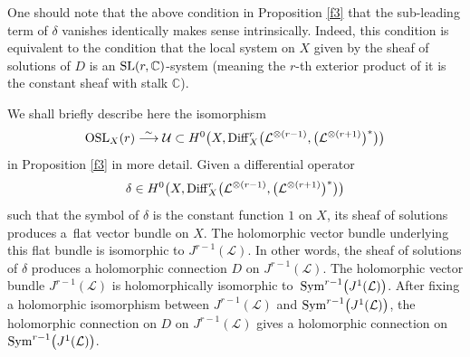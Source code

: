 \documentclass[10pt,a4paper]{amsart}
\numberwithin{equation}{section}
\begin{document}
\begin{Remark}One should note that the above condition in Proposition \ref{f3} that the sub-leading term of $\delta$ vanishes
identically makes sense intrinsically. Indeed, this condition is equivalent to the condition
that the local system on $X$ given by the sheaf of solutions of $D$ is an ${\rm SL}(r,
{\mathbb C})$-system (meaning the $r$-th exterior product of it is the constant sheaf with
stalk $\mathbb C$).\end{Remark}

We shall briefly describe here the isomorphism
\[{\rm OSL}_X(r) \stackrel{\sim}
{\longrightarrow} \mathcal U \subset H^0\bigl(X, {\rm Diff}^r_X
\bigl({\mathcal L}^{\otimes (r-1)}, \bigl({\mathcal L}^{\otimes (r+1)}\bigr)^*\bigr)\bigr)\]
in Proposition \ref{f3} in more detail. Given a differential operator
\[
\delta \in H^0\bigl(X, {\rm Diff}^r_X\bigl({\mathcal
L}^{\otimes (r-1)}, \bigl({\mathcal L}^{\otimes (r+1)}\bigr)^*\bigr)\bigr)\]
 such that the symbol of $\delta$ is the constant function
$1$ on $X$, its sheaf of solutions produces a~flat vector bundle on $X$. The holomorphic
vector bundle underlying this flat bundle is isomorphic to $J^{r-1}(\mathcal L)$. In other
words, the sheaf of solutions of $\delta$ produces a holomorphic connection $D$ on
$J^{r-1}(\mathcal L)$. The holomorphic vector bundle $J^{r-1}(\mathcal L)$ is
holomorphically isomorphic to~${\rm Sym}^{r-1}\bigl(J^1(\mathcal L)\bigr)$. After fixing a
holomorphic isomorphism between $J^{r-1}(\mathcal L)$ and ${\rm Sym}^{r-1}\bigl(J^1(\mathcal
L)\bigr)$, the holomorphic connection on $D$ on $J^{r-1}(\mathcal L)$ gives a holomorphic
connection on ${\rm Sym}^{r-1}\bigl(J^1(\mathcal L)\bigr)$.
\end{document}
